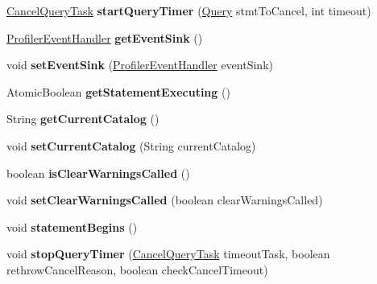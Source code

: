 \begin{DoxyCompactItemize}
\mbox{\hyperlink{interfacecom_1_1mysql_1_1cj_1_1_cancel_query_task}{Cancel\+Query\+Task}} {\bfseries start\+Query\+Timer} (\mbox{\hyperlink{interfacecom_1_1mysql_1_1cj_1_1_query}{Query}} stmt\+To\+Cancel, int timeout)
\item 
\mbox{\label{interfacecom_1_1mysql_1_1cj_1_1_query_a3e23446737570171c4323243ce3f9239}} 
\mbox{\hyperlink{interfacecom_1_1mysql_1_1cj_1_1log_1_1_profiler_event_handler}{Profiler\+Event\+Handler}} {\bfseries get\+Event\+Sink} ()
\item 
\mbox{\label{interfacecom_1_1mysql_1_1cj_1_1_query_ad50d1ecd73b6b2cac60cff6bec83bfbf}} 
void {\bfseries set\+Event\+Sink} (\mbox{\hyperlink{interfacecom_1_1mysql_1_1cj_1_1log_1_1_profiler_event_handler}{Profiler\+Event\+Handler}} event\+Sink)
\item 
\mbox{\label{interfacecom_1_1mysql_1_1cj_1_1_query_a330ed617e56f62061a3a300128456dbb}} 
Atomic\+Boolean {\bfseries get\+Statement\+Executing} ()
\item 
\mbox{\label{interfacecom_1_1mysql_1_1cj_1_1_query_a5e5e4f493fd7d0ea5e0ac6d2066af251}} 
String {\bfseries get\+Current\+Catalog} ()
\item 
\mbox{\label{interfacecom_1_1mysql_1_1cj_1_1_query_a456b19ab936c8d8ecd49dc23aaf6a833}} 
void {\bfseries set\+Current\+Catalog} (String current\+Catalog)
\item 
\mbox{\label{interfacecom_1_1mysql_1_1cj_1_1_query_af3f72d084a40a8ec805f10b75b8fa0f2}} 
boolean {\bfseries is\+Clear\+Warnings\+Called} ()
\item 
\mbox{\label{interfacecom_1_1mysql_1_1cj_1_1_query_a7ee7a059fdd6b703d9def2d3bd77a52f}} 
void {\bfseries set\+Clear\+Warnings\+Called} (boolean clear\+Warnings\+Called)
\item 
\mbox{\label{interfacecom_1_1mysql_1_1cj_1_1_query_a103f171654654e894600c59f324b651b}} 
void {\bfseries statement\+Begins} ()
\item 
\mbox{\label{interfacecom_1_1mysql_1_1cj_1_1_query_a2bee69e6ff58bb35af496297e1803c41}} 
void {\bfseries stop\+Query\+Timer} (\mbox{\hyperlink{interfacecom_1_1mysql_1_1cj_1_1_cancel_query_task}{Cancel\+Query\+Task}} timeout\+Task, boolean rethrow\+Cancel\+Reason, boolean check\+Cancel\+Timeout)
\end{DoxyCompactItemize}


